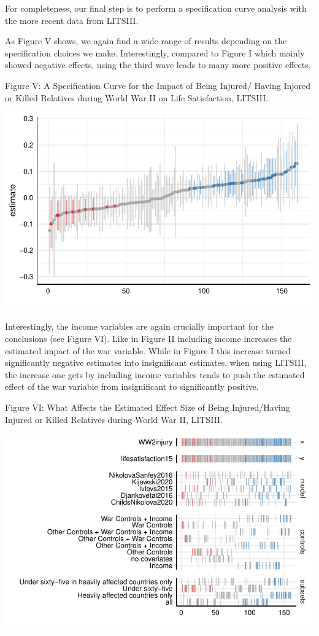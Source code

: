 \documentclass[
  letterpaper,
  DIV=11,
  numbers=noendperiod]{scrartcl}
\begin{document}
For completeness, our final step is to perform a specification curve
analysis with the more recent data from LITSIII.

As Figure V shows, we again find a wide range of results depending on
the specification choices we make. Interestingly, compared to Figure I
which mainly showed negative effects, using the third wave leads to many
more positive effects.

Figure V: A Specification Curve for the Impact of Being Injured/ Having
Injored or Killed Relatives during World War II on Life Satisfaction,
LITSIII.

\includegraphics{PAPERLongTermImpactofWaronLifeSatisfaction_files/figure-pdf/results to show Ia iii-1.pdf}

Interestingly, the income variables are again crucially important for
the conclusions (see Figure VI). Like in Figure II including income
increases the estimated impact of the war variable. While in Figure I
this increase turned significantly negative estimates into insignificant
estimates, when using LITSIII, the increase one gets by including income
variables tends to push the estimated effect of the war variable from
insignificant to significantly positive.

Figure VI: What Affects the Estimated Effect Size of Being
Injured/Having Injured or Killed Relatives during World War II, LITSIII.

\includegraphics{PAPERLongTermImpactofWaronLifeSatisfaction_files/figure-pdf/results to show Ib iii-1.pdf}
\end{document}
